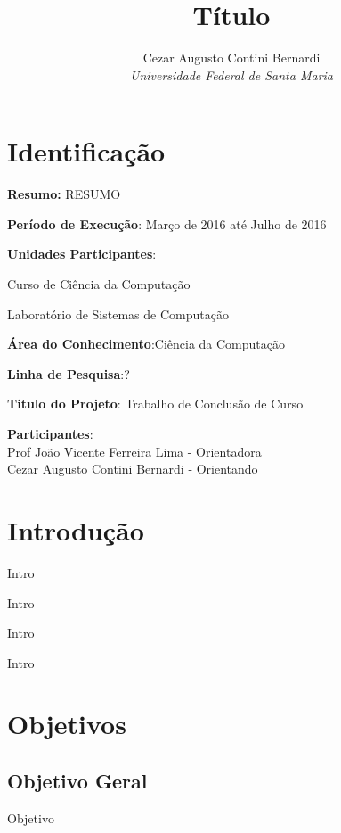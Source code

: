 \documentclass[12pt]{article}
\title{Título}
\author{Cezar Augusto Contini Bernardi \\ \emph{Universidade Federal de Santa Maria}}
\begin{document}
\maketitle


\section{Identificação}

\begin{description} \itemsep 0pt

\item{\textbf{Resumo:}} RESUMO


\item{\textbf{Período de Execução}}: Março de 2016 até Julho de 2016

\item{\textbf{Unidades Participantes}}: 

    Curso de Ciência da Computação
    
    Laboratório de Sistemas de Computação
    
    
\item{\textbf{Área do Conhecimento}}:Ciência da Computação

\item{\textbf{Linha de Pesquisa}}:?

\item{\textbf{Titulo do Projeto}}: Trabalho de Conclusão de Curso

\item{\textbf{Participantes}}:
\\Prof João Vicente Ferreira Lima - Orientadora
\\Cezar Augusto Contini Bernardi - Orientando
\\ 
\end{description}


\section{Introdução}

Intro

Intro

Intro

Intro

\section{Objetivos}
\subsection{Objetivo Geral}
Objetivo
\end{document}
